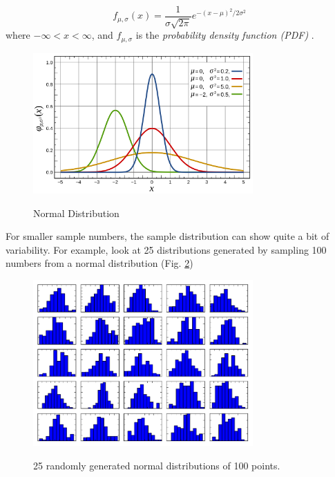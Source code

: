 \begin{equation}\label{eq_normal}
     f_{\mu,\sigma} (x) = \frac{1}{\sigma \sqrt{2 \pi}} e^{-( x - \mu )^2 /2 \sigma^2}
\end{equation}
where $ - \infty < x < \infty $, and $f_{\mu,\sigma}$ is the \emph{probability density function (PDF)} .

\begin{figure}
  \centering
  \includegraphics[width=0.75\textwidth]{../Images/Normal_Distribution_PDF.png}\\
  \caption{Normal Distribution}\label{fig:normal}
\end{figure}

For smaller sample numbers, the sample distribution can show quite a bit of variability. For example, look at 25 distributions generated by sampling 100 numbers from a normal distribution (Fig. \ref{fig:MultipleNormal})

\begin{figure}[h]
  \centering
  \includegraphics[width=0.75\textwidth]{../Images/Normal_MultHist.png}\\
  \caption{25 randomly generated normal distributions of 100 points.}\label{fig:MultipleNormal}
\end{figure}

